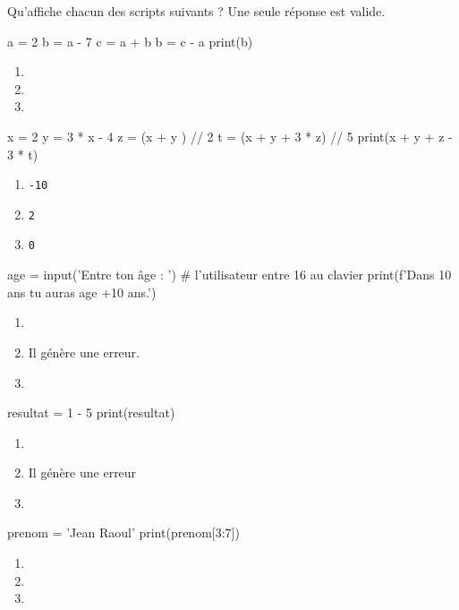 \documentclass[a4paper,10pt]{article}
\begin{document}

Qu'affiche chacun des scripts suivants ? Une seule réponse est valide.
\begin{multicols}{2}

\begin{pythoncode}
a = 2
b = a - 7
c = a + b
b = c - a
print(b)
\end{pythoncode}
\begin{enumerate}[\case\ \ a.]
\item {}
\item {}
\item {}

\end{enumerate}

\begin{pythoncode}
x = 2
y = 3 * x - 4
z = (x + y ) // 2
t = (x + y + 3 * z) // 5
print(x + y + z - 3 * t)
\end{pythoncode}

\begin{enumerate}[\case\ \ a.]
\item 	\texttt{-10}
\item 	\texttt{2}
\item 	\texttt{0}
\end{enumerate}

\begin{pythoncode}
age = input('Entre ton âge : ')
# l'utilisateur entre 16 au clavier
print(f'Dans 10 ans tu auras {age +10} ans.')
\end{pythoncode}

\begin{enumerate}[\case\ \ a.]
\item 	{}
\item 	Il génère une erreur.
\item 	{}
\end{enumerate}


\begin{pythoncode}
resultat = 1 - 5 %
print(resultat)
\end{pythoncode}

\begin{enumerate}[\case\ \ a.]
\item {}
\item Il génère une erreur
\item {}
\end{enumerate}


\begin{pythoncode}
prenom = 'Jean Raoul'
print(prenom[3:7])
\end{pythoncode}
\begin{enumerate}[\case\ \ a.]
\item 	{}
\item 	{}
\item 	{}
\end{enumerate}


\end{multicols}
\end{document}
